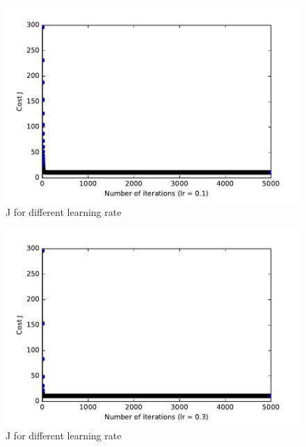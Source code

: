 \documentclass[pdftex,11pt]{article}
\begin{document}
\begin{figure}[H]
  \caption{J for different learning rate}
  \centering
    \includegraphics[scale=1]{fig01.pdf}
\end{figure}
\begin{figure}[H]
  \caption{J for different learning rate}
  \centering
    \includegraphics[scale=1]{fig03.pdf}
\end{figure}
\end{document}
